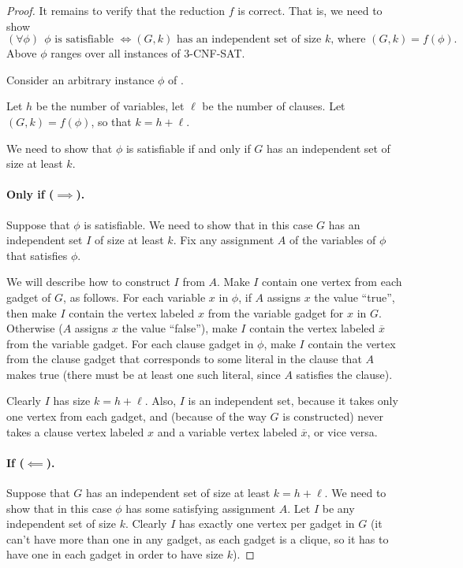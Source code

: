 \documentclass[11pt]{article}
\begin{document}
\begin{proof}
  It remains to verify that the reduction $f$ is correct.
  That is, we need to show
  \[(\forall \phi)~~\phi \text{ is satisfiable } \iff (G,k) \text{ has an independent set of size $k$, where } (G,k) = f(\phi).\]
  Above $\phi$ ranges over all instances of 3-CNF-SAT.

  Consider an arbitrary instance $\phi$ of .
  
  Let $h$ be the number of variables,
  let $\ell$ be the number of clauses.
  Let $(G,k) = f(\phi)$, so that $k = h+\ell$.
  
  We need to show that
  $\phi$ is satisfiable if and only if $G$ has an independent set of size at least $k$.

  \paragraph{Only if ($\implies$).}  Suppose that $\phi$ is satisfiable.  
  We need to show that in this case $G$ has an independent set $I$ of size at least $k$.
  Fix any assignment $A$ of the variables of $\phi$ that satisfies $\phi$.

  We will describe how to construct $I$ from $A$.
  Make $I$ contain one vertex from each gadget of $G$, as follows.
  For each variable $x$ in $\phi$,
  if $A$ assigns $x$ the value ``true'',
  then make $I$ contain the vertex labeled $x$ from the variable gadget for $x$ in $G$.
  Otherwise
  ($A$ assigns $x$ the value ``false''),
  make $I$ contain the vertex labeled $\overline x$ from the variable gadget.
  For each clause gadget in $\phi$,
  make $I$ contain the vertex from the clause gadget
  that corresponds to some literal in the clause that $A$ makes true
  (there must be at least one such literal, since $A$ satisfies the clause).

  Clearly $I$ has size $k = h+\ell$.
  Also, $I$ is an independent set, because it takes only one vertex from each gadget,
  and (because of the way $G$ is constructed)
  never takes a clause vertex labeled $x$ and a variable vertex labeled $\overline x$,
  or vice versa.

  \paragraph{If ($\impliedby$).} Suppose that $G$ has an independent set of size at least $k=h+\ell$.
  We need to show that in this case $\phi$ has some satisfying assignment $A$.
  Let $I$ be any independent set of size $k$.
  Clearly $I$ has exactly one vertex per gadget in $G$
  (it can't have more than one in any gadget, as each gadget is a clique,
  so it has to have one in each gadget in order to have size $k$).


\end{proof}
\end{document}
